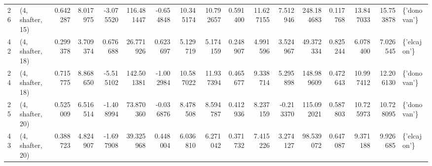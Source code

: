 \begin{tabular}{llrrrrrrrrrrrrrrl}
26 &  (4, shafter, 15) &   0.642287 &   8.017975 & -3.075520 &  116.481447 & -0.654848 &  10.345174 &  10.792657 &  0.591400 &  11.627155 &   7.512946 &  248.184683 &  0.117768 &  13.847033 &  15.753878 &  \{'donovan'\} \\
42 &  (4, shafter, 18) &   0.299378 &   3.709374 &  0.676688 &   26.771926 &  0.623697 &   5.129719 &   5.174159 &  0.248907 &   4.991596 &   3.524967 &   49.372334 &  0.825244 &   6.078400 &   7.026545 &  \{'elcajon'\} \\
24 &  (4, shafter, 18) &   0.715775 &   8.868650 & -5.515102 &  142.501381 & -1.002984 &  10.587022 &  11.937394 &  0.465677 &   9.338714 &   5.295898 &  148.989609 &  0.472643 &  10.997412 &  12.206130 &  \{'donovan'\} \\
25 &  (4, shafter, 20) &   0.525009 &   6.516514 & -1.408994 &   73.870360 & -0.036876 &   8.478508 &   8.594787 &  0.412936 &   8.237159 &  -0.213370 &  115.092021 &  0.587803 &  10.725973 &  10.728095 &  \{'donovan'\} \\
43 &  (4, shafter, 20) &   0.388723 &   4.824907 & -1.697908 &   39.325968 &  0.448004 &   6.036810 &   6.271042 &  0.371732 &   7.415226 &   3.274127 &   98.539072 &  0.647087 &   9.371188 &   9.926685 &  \{'elcajon'\} \\
\bottomrule
\end{tabular}
